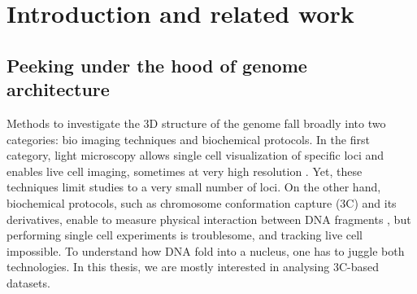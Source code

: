 

\chapter{Introduction and related work}

\graphicspath{{1_introduction/}}

\begin{abstract}{Résumé}

L'architecture spatiale et temporelle du génome joue un rôle important dans
beaucoup de fonctions génomiques, mais est cependant à l'heure actuelle peu
comprise. Le développement récent du protocol Hi-C, qui permet en une seule
expérience de mesurer les fréquences d'interactions entre paire de loci sur
tout le génome, ouvre la porte à une étude plus systématique de la structure
tridimensionnelle du génome. Dans ce chapitre, nous introduisons les concepts
sous-jacents à la capture de la conformation des chromosomes, la structure de
l'ADN et aux méthodes d'inférence de l'architecture 3D du génome.

\end{abstract}

\begin{abstract}{Abstract}

The spatial and temporal genome architecture is thought to play an important
role in many genomic functions, but is yet poorly understood. Recently, the
development of the Hi-C protocol, which allows in a single experiment to
assess genome wide physical interactions between pairs of loci, has paved the
way for a systematic analysis of the 3D structure of DNA. We aim in this
chapter at providing some background on chromosome conformation capture, the
structure of DNA and the field of 3D architecture inference.

\end{abstract}


\section{Peeking under the hood of genome architecture}

Methods to investigate the 3D structure of the genome fall broadly into two
categories: bio imaging techniques and biochemical protocols. In the first
category, light microscopy allows single cell visualization of specific loci
and enables live cell imaging, sometimes at very high resolution
\citep{cremer:chromosome-2010}. Yet, these techniques limit studies to a very
small number of loci. On the other hand, biochemical protocols, such as
chromosome conformation capture (3C) and its derivatives, enable to measure
physical interaction between DNA fragments \citep{dekker:capturing}, but
performing single cell experiments is troublesome, and tracking live cell
impossible. To understand how DNA fold into a nucleus, one has to juggle
both technologies. In this thesis, we are mostly interested in
analysing 3C-based datasets.

